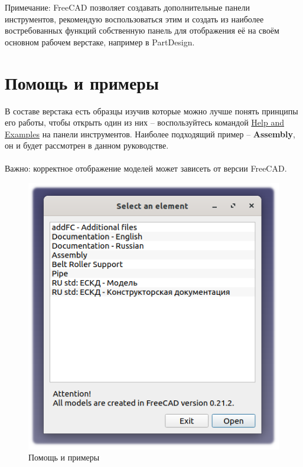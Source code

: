 \documentclass[a4paper,12pt]{article}
\begin{document}
Примечание: FreeCAD позволяет создавать дополнительные панели инструментов, рекомендую воспользоваться этим и создать из наиболее востребованных функций собственную панель для отображения её на своём основном рабочем верстаке, например в PartDesign.

\pagebreak




\section{Помощь и примеры}

В составе верстака есть образцы изучив которые можно лучше понять принципы его работы, чтобы открыть один из них -- воспользуйтесь командой \hyperref[sec:10]{Help and Examples} на панели инструментов. Наиболее подходящий пример -- \textbf{Assembly}, он и будет рассмотрен в данном руководстве.\\\\
Важно: корректное отображение моделей может зависеть от версии FreeCAD.


\begin{figure}[htp]
	\centering
	\includegraphics[scale=1]{img/assistant.png}
	\caption{Помощь и примеры}
	\label{sec:assistant}
\end{figure}
\end{document}
